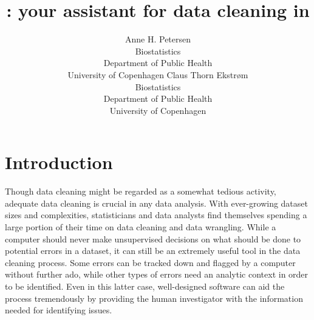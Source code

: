\documentclass[article,shortnames]{jss}
\author{Anne H. Petersen\\Biostatistics\\Department of Public
  Health\\University of Copenhagen \And Claus Thorn Ekstr\o m\\Biostatistics\\Department of Public
  Health\\University of Copenhagen}
\title{\pkg{dataMaid}: your assistant for data cleaning in \proglang{R}}
\begin{document}
\section{Introduction}
Though data cleaning might be regarded as a somewhat tedious activity,
adequate data cleaning is crucial in any data analysis. With
ever-growing dataset sizes and complexities, statisticians and data
analysts find themselves spending a large portion of their time on
data cleaning and data wrangling. While a computer should never
make unsupervised decisions on what should be done to potential
errors in a dataset, it can still be an extremely useful tool in the
data cleaning process. Some errors can be tracked down and flagged by a
computer without further ado, while other types of errors need an analytic
context in order to be identified. Even in this latter case, well-designed
software can aid the process tremendously by providing the human
investigator with the
information needed for identifying issues.
\end{document}
